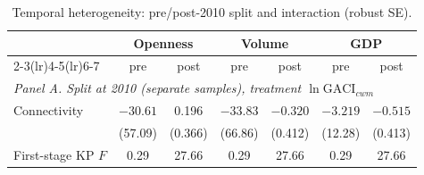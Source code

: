 \begin{table}[t]
\centering
\caption{Temporal heterogeneity: pre/post-2010 split and interaction (robust SE).}
\label{tab:temporal}
\begin{threeparttable}
\small
\begin{tabular}{lcccccc}
\toprule
 & \multicolumn{2}{c}{Openness} & \multicolumn{2}{c}{Volume} & \multicolumn{2}{c}{GDP} \\
\cmidrule(lr){2-3}\cmidrule(lr){4-5}\cmidrule(lr){6-7}
 & pre & post & pre & post & pre & post \\
\midrule
\multicolumn{7}{l}{\emph{Panel A. Split at 2010 (separate samples), treatment $\ln\mathrm{GACI}_{cwm}$}}\\
Connectivity & $-30.61$ & 0.196 & $-33.83$ & $-0.320$ & $-3.219$ & $-0.515$ \\
             & (57.09)  & (0.366) & (66.86) & (0.412) & (12.28) & (0.413) \\
First-stage KP $F$ & 0.29 & 27.66 & 0.29 & 27.66 & 0.29 & 27.66 \\
\bottomrule
\end{tabular}


\end{threeparttable}
\end{table}
